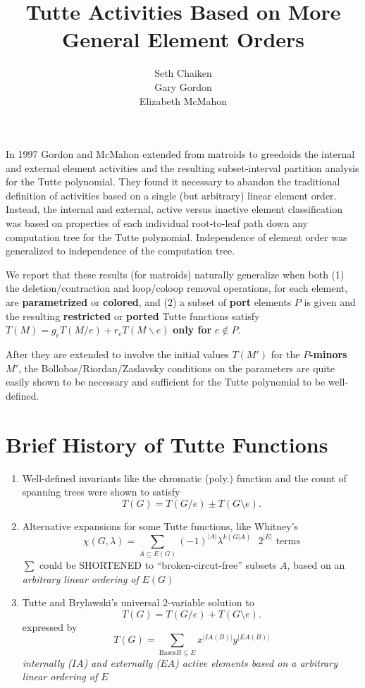 \documentclass{article}
\title{Tutte Activities Based on More General Element Orders}
\author{Seth Chaiken\\
Gary Gordon\\
Elizabeth McMahon}
\begin{document}
\maketitle
In 1997 Gordon and McMahon\cite{GordonMcMachonGreedoid} 
extended from matroids to greedoids
the internal and external 
element activities and the resulting subset-interval 
partition analysis for the Tutte polynomial.  They found it necessary
to abandon the traditional definition of activities based on a 
single (but arbitrary) linear element order.  Instead, the internal and 
external, active versus inactive element classification was based on 
properties of each individual root-to-leaf path down any computation tree
for the Tutte polynomial.  Independence of element order was generalized to
independence of the computation tree.

We report that these results (for matroids) naturally generalize when both (1) 
the deletion/contraction and loop/coloop removal operations, for each element,
are \textbf{parametrized} or 
\textbf{colored}, and (2) a subset of \textbf{port} elements 
$P$ is given and the resulting \textbf{restricted} or \textbf{ported}
Tutte functions satisfy $T(M) = g_e T(M/e) + r_e T(M\backslash e)$ 
\textbf{only for} $e\not\in P$.

After they are extended to involve the initial values $T(M')$ for 
the \textbf{$P$-minors} $M'$, the Bollobas/Riordan/Zaslavsky 
conditions on the parameters are quite easily 
shown to be necessary and sufficient for the Tutte polynomial to be
well-defined.

\newpage

\LARGE

\section{Brief History of Tutte Functions}
\begin{enumerate}
\item Well-defined invariants like the chromatic (poly.) function 
and the count of spanning trees were shown to satisfy
\[
T(G) = T(G/e) \pm T(G\setminus e).
\]
\item
Alternative expansions for some Tutte functions, like Whitney's
\[
\chi(G,\lambda) = \sum_{A\subseteq E(G)}(-1)^{|A|}\lambda^{k(G|A)}\text{\ \ \ }2^{|E|}
\text{ terms}
\]
$\sum$ could be SHORTENED to ``broken-circut-free'' subsets $A$, based on
an \textit{arbitrary linear ordering of }$E(G)$
\item
Tutte and Brylawski's universal 2-variable solution to 
\[
T(G) = T(G/e) + T(G\setminus e).
\]
expressed by
\[
T(G) = \sum_{\text{Bases}B\subseteq E}x^{|IA(B)|}y^{|EA(B)|}
\]
\textit{ internally ($IA$) and externally ($EA$)
active elements based on a arbitrary linear ordering of $E$}
\end{enumerate}
\end{document}
